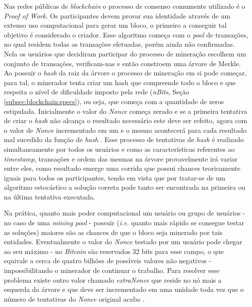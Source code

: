 %
Nas redes públicas de \textit{blockchain} o processo de consenso comumente utilizado é o \textit{Proof of Work}. Os participantes devem provar sua identidade através de um extenso uso computacional para gerar um bloco, o primeiro a conseguir tal objetivo é considerado o criador. Esse algoritmo começa com o \textit{pool} de transações, no qual residem todas as transações efetuadas, porém ainda não confirmadas. Nela os usuários que decidiram participar do processo de mineração escolhem um conjunto de transações, verificam-nas e então constroem uma árvore de Merkle. Ao possuir o \textit{hash} da raiz da árvore o processo de mineração em si pode começar, para tal, o minerador tenta criar um hash que compreende todo o bloco e que respeita o nível de dificuldade imposto pela rede (\textit{nBits}, Seção \ref{subsec:blockchain:specs}), ou seja, que começa com a quantidade de zeros estipulada. Inicialmente o valor do \textit{Nonce} começa zerado e se a primeira tentativa de criar o \textit{hash} não alcança o resultado necessário este deve ser refeito, agora com o valor de \textit{Nonce} incrementado em um e o mesmo acontecerá para cada resultado mal sucedido da função de \textit{hash} \cite{blockchain:capitulo5, blockchain:survey_bitcoin}.
%
Esse processo de tentativas de \textit{hash} é realizado simultaneamente por todos os usuários e como as características referentes ao \textit{timestamp}, transações e ordem das mesmas na árvore provavelmente irá variar entre eles, como resultado emerge uma corrida que possui chances teoricamente iguais para todos os participantes, tendo em vista que por tratar-se de um algoritmo estocástico a solução correta pode tanto ser encontrada na primeira ou na última tentativa executada.

%
Na prática, quanto mais poder computacional um usuário ou grupo de usuários - no caso de uma \textit{mining pool} - possuir (\textit{i.e.} quanto mais rápido se consegue testar as soluções) maiores são as chances de que o bloco seja minerado por tais entidades. Eventualmente o valor do \textit{Nonce} testado por um usuário pode chegar ao seu máximo - no \textit{Bitcoin} são reservados 32 bits para esse campo, o que equivale a cerca de quatro bilhões de possíveis valores não negativos - impossibilitando o minerador de continuar o trabalho. Para resolver esse problema existe outro valor chamado \textit{extraNonce} que reside no nó mais a esquerda da árvore e que deve ser incrementado em uma unidade toda vez que o número de tentativas do \textit{Nonce} original acaba \cite{blockchain:mastering_bitcoin}. 

